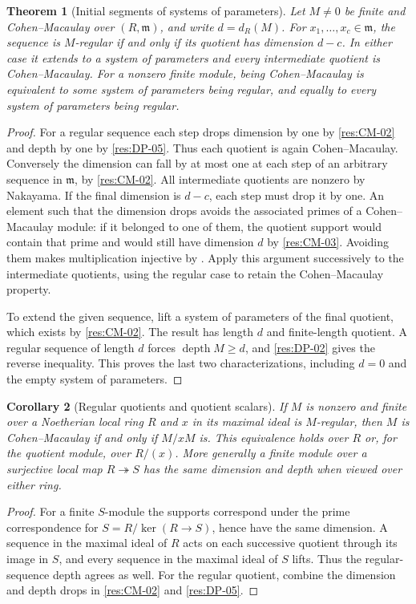 \documentclass[11pt,oneside,openany]{book}
\newtheorem{theorem}{Theorem}[chapter]
\newtheorem{corollary}[theorem]{Corollary}
\theoremstyle{definition}
\theoremstyle{remark}
\begin{document}
\begin{theorem}[Initial segments of systems of parameters]\label{res:CM-04}
Let $M\ne0$ be finite and Cohen--Macaulay over $(R,\mathfrak m)$,
and write $d=d_R(M)$. For $x_1,\ldots,x_c\in\mathfrak m$,
the sequence is $M$-regular if and only if its quotient has
dimension $d-c$. In either case it extends to a system of
parameters and every intermediate quotient is Cohen--Macaulay.
For a nonzero finite module, being Cohen--Macaulay is equivalent
to some system of parameters being regular, and equally to every
system of parameters being regular.
\end{theorem}
\begin{proof}
For a regular sequence each step drops dimension by one by
\ref{res:CM-02} and depth by one by \ref{res:DP-05}. Thus each
quotient is again Cohen--Macaulay. Conversely the dimension
can fall by at most one at each step of an arbitrary sequence
in $\mathfrak m$, by \ref{res:CM-02}. All intermediate quotients
are nonzero by Nakayama. If the final dimension is $d-c$, each
step must drop it by one. An element such that the dimension
drops avoids the associated primes of a Cohen--Macaulay module:
if it belonged to one of them, the quotient support would contain
that prime and would still have dimension $d$ by \ref{res:CM-03}.
Avoiding them makes multiplication injective by
\cite[Theorem ALG-05-C02-S03]{p103}. Apply this argument successively
to the intermediate quotients, using the regular case to retain
the Cohen--Macaulay property.

To extend the given sequence, lift a system of parameters of the
final quotient, which exists by \ref{res:CM-02}. The result has
length $d$ and finite-length quotient. A regular sequence of
length $d$ forces $\operatorname{depth} M\ge d$, and
\ref{res:DP-02} gives the reverse inequality. This proves
the last two characterizations, including $d=0$ and the
empty system of parameters.
\end{proof}

\begin{corollary}[Regular quotients and quotient scalars]\label{res:CM-05}
If $M$ is nonzero and finite over a Noetherian local ring $R$
and $x$ in its maximal ideal is $M$-regular, then $M$ is
Cohen--Macaulay if and only if $M/xM$ is. This equivalence holds
over $R$ or, for the quotient module, over $R/(x)$.
More generally a finite module over a surjective local map
$R\twoheadrightarrow S$ has the same dimension and depth
when viewed over either ring.
\end{corollary}
\begin{proof}
For a finite $S$-module the supports correspond under the
prime correspondence for $S=R/\ker(R\to S)$, hence have the
same dimension. A sequence in the maximal ideal of $R$ acts
on each successive quotient through its image in $S$, and
every sequence in the maximal ideal of $S$ lifts. Thus the
regular-sequence depth agrees as well. For the regular quotient,
combine the dimension and depth drops in
\ref{res:CM-02} and \ref{res:DP-05}.
\end{proof}
\end{document}
